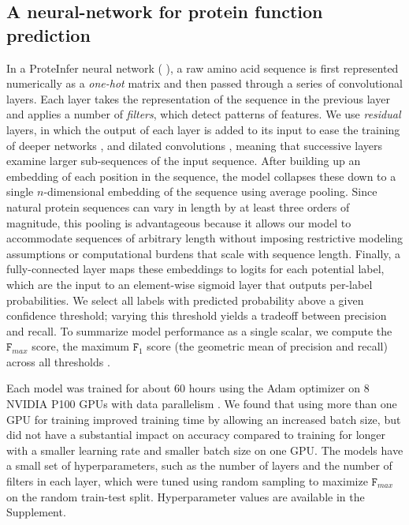 \subsection*{A neural-network for protein function prediction}
In a ProteInfer neural network (%
), a raw amino acid sequence is first represented numerically as a \textit{one-hot} matrix and then passed through a series of convolutional layers. Each layer takes the representation of the sequence in the previous layer and applies a number of \textit{filters}, which detect patterns of features. We use \textit{residual} layers, in which the output of each layer is added to its input to ease the training of deeper networks \cite{resnet}, and dilated convolutions \cite{dilatedconvolutions}, meaning that successive layers examine larger sub-sequences of the input sequence. After building up an embedding of each position in the sequence, the model collapses these down to a single $n$-dimensional embedding of the sequence using average pooling. Since natural protein sequences can vary in length by at least three orders of magnitude, this pooling is advantageous because it allows our model to accommodate sequences of arbitrary length without imposing restrictive modeling assumptions or computational burdens that scale with sequence length. Finally, a fully-connected layer maps these embeddings to logits for each potential label, which are the input to an element-wise sigmoid layer that outputs per-label probabilities. 
We select all labels with predicted probability above a given confidence threshold; varying this threshold yields a tradeoff between precision and recall. To summarize model performance as a single scalar, we compute the $\texttt{F}_{max}$ score, the maximum $\texttt{F}_{1}$ score (the geometric mean of precision and recall) across all thresholds \citep{radivojac2013large}.  

Each model was trained for about 60 hours using the Adam optimizer \citep{kingma2014adam} on 8 NVIDIA P100 GPUs with data parallelism \cite{dean2012large, dataparalellism}.  We found that using more than one GPU for training improved training time by allowing an increased batch size, but did not have a substantial impact on accuracy compared to training for longer with a smaller learning rate and smaller batch size on one GPU. The models have a small set of hyperparameters, such as the number of layers and the number of filters in each layer, which were tuned using random sampling to maximize $\texttt{F}_{max}$ on the random train-test split. Hyperparameter values are available in the Supplement.

